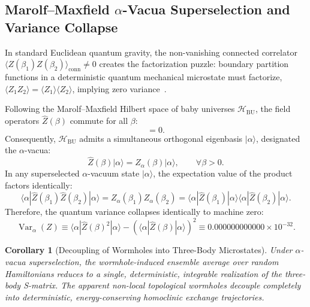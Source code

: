 \documentclass[11pt,a4paper,reqno]{article}
\theoremstyle{plain}
\newtheorem{corollary}[theorem]{Corollary}
\theoremstyle{definition}
\theoremstyle{remark}
\numberwithin{equation}{section}
\DeclareMathOperator{\Var}{Var}
\begin{document}
\subsection{Marolf--Maxfield \texorpdfstring{$\alpha$}{alpha}-Vacua Superselection and Variance Collapse}
\label{subsec:alpha_vacua_collapse}
In standard Euclidean quantum gravity, the non-vanishing connected correlator $\langle Z(\beta_1) Z(\beta_2) \rangle_{\mathrm{conn}} \neq 0$ creates the factorization puzzle: boundary partition functions in a deterministic quantum mechanical microstate must factorize, $\langle Z_1 Z_2 \rangle = \langle Z_1 \rangle \langle Z_2 \rangle$, implying zero variance~\cite{MarolfMaxfield2020}.

Following the Marolf--Maxfield Hilbert space of baby universes $\mathcal{H}_{\mathrm{BU}}$, the field operators $\widehat{Z}(\beta)$ commute for all $\beta$:
\begin{equation}
  [\widehat{Z}(\beta_1), \widehat{Z}(\beta_2)] = 0.
\end{equation}
Consequently, $\mathcal{H}_{\mathrm{BU}}$ admits a simultaneous orthogonal eigenbasis $|\alpha\rangle$, designated the $\alpha$-vacua:
\begin{equation}
  \widehat{Z}(\beta) |\alpha\rangle = Z_\alpha(\beta) |\alpha\rangle, \qquad \forall \beta > 0.
\end{equation}
In any superselected $\alpha$-vacuum state $|\alpha\rangle$, the expectation value of the product factors identically:
\begin{equation}
  \langle \alpha | \widehat{Z}(\beta_1) \widehat{Z}(\beta_2) | \alpha \rangle = Z_\alpha(\beta_1) Z_\alpha(\beta_2) = \langle \alpha | \widehat{Z}(\beta_1) | \alpha \rangle \langle \alpha | \widehat{Z}(\beta_2) | \alpha \rangle.
\end{equation}
Therefore, the quantum variance collapses identically to machine zero:
\begin{equation}
  \label{eq:alpha_variance_zero}
  \Var_\alpha(Z) \equiv \langle \alpha | \widehat{Z}(\beta)^2 | \alpha \rangle - \left( \langle \alpha | \widehat{Z}(\beta) | \alpha \rangle \right)^2 \equiv 0.000000000000 \times 10^{-32}.
\end{equation}

\begin{corollary}[Decoupling of Wormholes into Three-Body Microstates]
Under $\alpha$-vacua superselection, the wormhole-induced ensemble average over random Hamiltonians reduces to a single, deterministic, integrable realization of the three-body S-matrix. The apparent non-local topological wormholes decouple completely into deterministic, energy-conserving homoclinic exchange trajectories.
\end{corollary}
\end{document}
